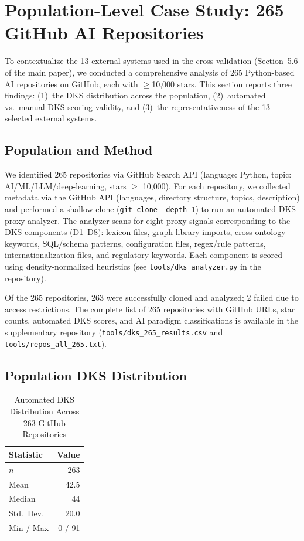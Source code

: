 \documentclass[10pt,a4paper]{article}
\begin{document}
\section{Population-Level Case Study: 265 GitHub AI Repositories}
\label{sec:casestudy}

To contextualize the 13 external systems used in the cross-validation (Section~5.6 of the main paper), we conducted a comprehensive analysis of 265 Python-based AI repositories on GitHub, each with $\geq$10{,}000 stars. This section reports three findings: (1)~the DKS distribution across the population, (2)~automated vs.\ manual DKS scoring validity, and (3)~the representativeness of the 13 selected external systems.

\subsection{Population and Method}

We identified 265 repositories via GitHub Search API (language: Python, topic: AI/ML/LLM/deep-learning, stars $\geq$ 10{,}000). For each repository, we collected metadata via the GitHub API (languages, directory structure, topics, description) and performed a shallow clone (\texttt{git clone --depth 1}) to run an automated DKS proxy analyzer. The analyzer scans for eight proxy signals corresponding to the DKS components (D1--D8): lexicon files, graph library imports, cross-ontology keywords, SQL/schema patterns, configuration files, regex/rule patterns, internationalization files, and regulatory keywords. Each component is scored using density-normalized heuristics (see \texttt{tools/dks\_analyzer.py} in the repository).

Of the 265 repositories, 263 were successfully cloned and analyzed; 2 failed due to access restrictions. The complete list of 265 repositories with GitHub URLs, star counts, automated DKS scores, and AI paradigm classifications is available in the supplementary repository (\texttt{tools/dks\_265\_results.csv} and \texttt{tools/repos\_all\_265.txt}).

\subsection{Population DKS Distribution}

\begin{table}[H]
\centering
\caption{Automated DKS Distribution Across 263 GitHub Repositories}
\label{tab:pop_dks}
\begin{tabular}{@{}lr@{}}
\toprule
\textbf{Statistic} & \textbf{Value} \\
\midrule
$n$ & 263 \\
Mean & 42.5 \\
Median & 44 \\
Std.\ Dev. & 20.0 \\
Min / Max & 0 / 91 \\
\bottomrule
\end{tabular}
\end{table}
\end{document}
